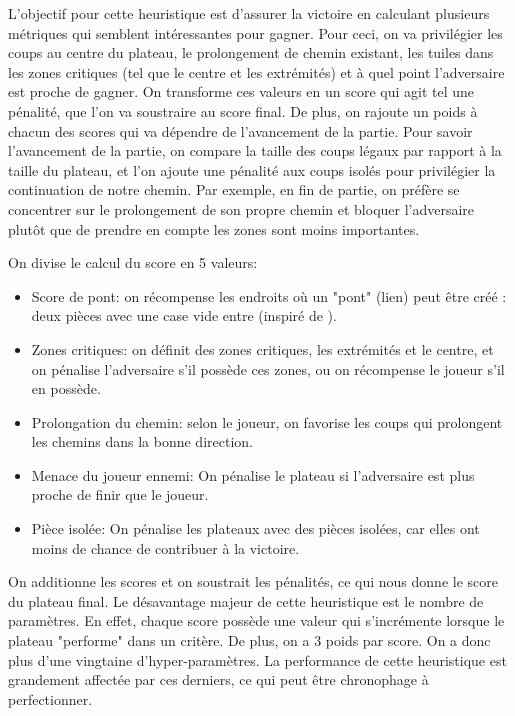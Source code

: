 \documentclass[12pt]{article}
\begin{document}
L’objectif pour cette heuristique est d'assurer la victoire en calculant plusieurs métriques qui semblent intéressantes pour gagner. Pour ceci, on va privilégier les coups au centre du plateau, le prolongement de chemin existant, les tuiles dans les zones critiques (tel que le centre et les extrémités) et à quel point l’adversaire est proche de gagner. On transforme ces valeurs en un score qui agit tel une pénalité, que l’on va soustraire au score final. De plus, on rajoute un poids à chacun des scores qui va dépendre de l’avancement de la partie. Pour savoir l’avancement de la partie, on compare la taille des coups légaux par rapport à la taille du plateau, et l’on ajoute une pénalité aux coups isolés pour privilégier la continuation de notre chemin. Par exemple, en fin de partie, on préfère se concentrer sur le prolongement de son propre chemin et bloquer l’adversaire plutôt que de prendre en compte les zones sont moins importantes.

\bigskip
On divise le calcul du score en 5 valeurs:

\begin{itemize}
    \item Score de pont: on récompense les endroits où un "pont" (lien) peut être créé : deux pièces avec une case vide entre (inspiré de \cite{AHH10}).
    \item Zones critiques: on définit des zones critiques, les extrémités et le centre, et on pénalise l’adversaire s'il possède ces zones, ou on récompense le joueur s'il en possède.
    \item Prolongation du chemin: selon le joueur, on favorise les coups qui prolongent les chemins dans la bonne direction.
    \item Menace du joueur ennemi: On pénalise le plateau si l’adversaire est plus proche de finir que le joueur.
    \item Pièce isolée: On pénalise les plateaux avec des pièces isolées, car elles ont moins de chance de contribuer à la victoire.
\end{itemize}

\bigskip
On additionne les scores et on soustrait les pénalités, ce qui nous donne le score du plateau final. Le désavantage majeur de cette heuristique est le nombre de paramètres. En effet, chaque score possède une valeur qui s’incrémente lorsque le plateau "performe" dans un critère. De plus, on a 3 poids par score. On a donc plus d’une vingtaine d’hyper-paramètres. La performance de cette heuristique est grandement affectée par ces derniers, ce qui peut être chronophage à perfectionner.
\end{document}
